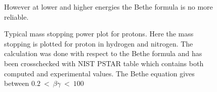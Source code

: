 \begin{figure}[ht]
	
	\caption[Typical mass stopping power plot for protons]{Typical mass stopping power plot for protons. Here the mass stopping is plotted for proton in hydrogen and nitrogen.
		The calculation was done with respect to the Bethe formula and
		has been crosschecked with NIST PSTAR table\cite{Seltzer1993} which contains both computed and experimental values.
		The Bethe equation gives between \(0.2\ <\ \beta\gamma\ <\ 100\)}
	However at lower and higher energies the Bethe formula is no more reliable.
	\label{chap3:bethe1}
\end{figure}
